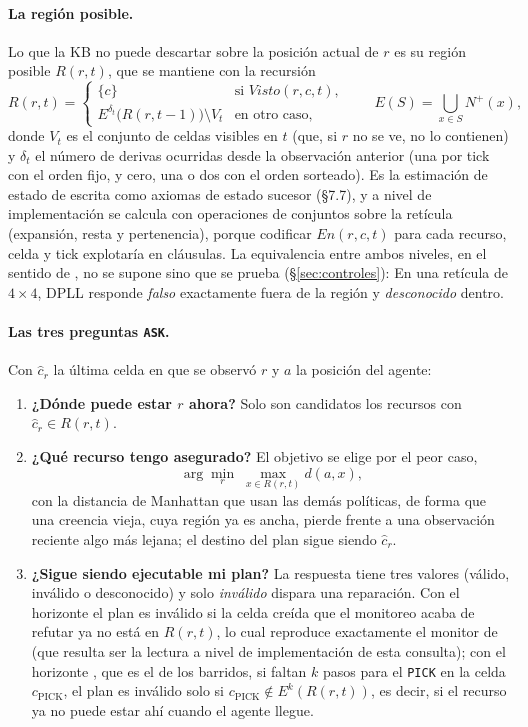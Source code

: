\paragraph{La región posible.} Lo que la KB no puede descartar sobre la posición actual de $r$ es su región posible $R(r,t)$, que se mantiene con la recursión
\begin{equation}
  R(r,t) =
  \begin{cases}
    \{c\} & \text{si } \mathit{Visto}(r,c,t),\\[2pt]
    E^{\delta_t}\!\bigl(R(r,t-1)\bigr) \setminus V_t & \text{en otro caso,}
  \end{cases}
  \qquad E(S) = \bigcup_{x \in S} N^{+}(x),
\end{equation}
donde $V_t$ es el conjunto de celdas visibles en $t$ (que, si $r$ no se ve, no lo contienen) y $\delta_t$ el número de derivas ocurridas desde la observación anterior (una por tick con el orden fijo, y cero, una o dos con el orden sorteado). Es la estimación de estado de \textcite[§4.4]{russellNorvig2020} escrita como axiomas de estado sucesor (§7.7), y a nivel de implementación se calcula con operaciones de conjuntos sobre la retícula (expansión, resta y pertenencia), porque codificar $\mathit{En}(r,c,t)$ para cada recurso, celda y tick explotaría en cláusulas. La equivalencia entre ambos niveles, en el sentido de \textcite{newell1982knowledge}, no se supone sino que se prueba (§\ref{sec:controles}): En una retícula de $4\times4$, DPLL responde \emph{falso} exactamente fuera de la región y \emph{desconocido} dentro.

\paragraph{Las tres preguntas \texttt{ASK}.} Con $\hat{c}_r$ la última celda en que se observó $r$ y $a$ la posición del agente:
\begin{enumerate}[leftmargin=1.6em, itemsep=0.2em]
  \item \textbf{¿Dónde puede estar $r$ ahora?} Solo son candidatos los recursos con $\hat{c}_r \in R(r,t)$.
  \item \textbf{¿Qué recurso tengo asegurado?} El objetivo se elige por el peor caso,
  \[
    \arg\min_r\; \max_{x \in R(r,t)} d(a,x),
  \]
  con la distancia de Manhattan que usan las demás políticas, de forma que una creencia vieja, cuya región ya es ancha, pierde frente a una observación reciente algo más lejana; el destino del plan sigue siendo $\hat{c}_r$.
  \item \textbf{¿Sigue siendo ejecutable mi plan?} La respuesta tiene tres valores (válido, inválido o desconocido) y solo \emph{inválido} dispara una reparación. Con el horizonte \ahora{} el plan es inválido si la celda creída que el monitoreo acaba de refutar ya no está en $R(r,t)$, lo cual reproduce exactamente el monitor de \CL{} (que resulta ser la lectura a nivel de implementación de esta consulta); con el horizonte \llegada{}, que es el de los barridos, si faltan $k$ pasos para el \texttt{PICK} en la celda $c_{\text{PICK}}$, el plan es inválido solo si $c_{\text{PICK}} \notin E^{k}(R(r,t))$, es decir, si el recurso ya no puede estar ahí cuando el agente llegue.
\end{enumerate}

